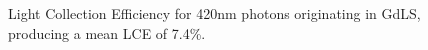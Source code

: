 \begin{figure}[!htbp]
\centering
\resizebox{\textwidth}{!}{

}
\caption{Light Collection Efficiency for 420nm photons originating in GdLS, producing a mean LCE of 7.4\%.}
\label{fig:od_lce}
\end{figure}

%